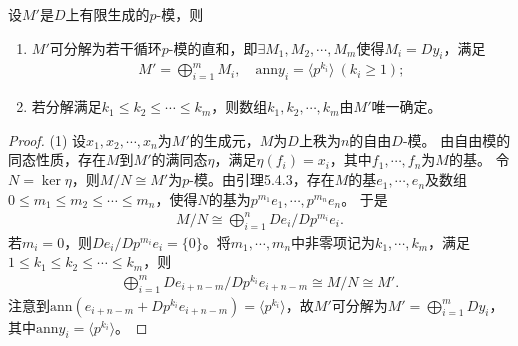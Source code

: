 \documentclass[../../main.tex]{subfiles}%
\begin{document}
\begin{theorem}
设$M'$是$D$上有限生成的$p$-模，则
\begin{enumerate}[(1)]
\item $M'$可分解为若干循环$p$-模的直和，即$\exists M_1,M_2,\cdots,M_m$使得$M_i=Dy_i$，满足
\begin{align*}
M'=\bigoplus\limits_{i=1}^{m}M_i,\quad \mathrm{ann}y_i=\langle p^{k_i}\rangle\ (k_i\geqslant1);
\end{align*}
\item 若分解满足$k_1\leqslant k_2\leqslant\cdots\leqslant k_m$，则数组$k_1,k_2,\cdots,k_m$由$M'$唯一确定。
\end{enumerate}
\end{theorem}
\begin{proof}
(1) 设$x_1,x_2,\cdots,x_n$为$M'$的生成元，$M$为$D$上秩为$n$的自由$D$-模。
由自由模的同态性质，存在$M$到$M'$的满同态$\eta$，满足$\eta(f_i)=x_i$，其中$f_1,\cdots,f_n$为$M$的基。
令$N=\ker\eta$，则$M/N\cong M'$为$p$-模。由引理5.4.3，存在$M$的基$e_1,\cdots,e_n$及数组$0\leqslant m_1\leqslant m_2\leqslant\cdots\leqslant m_n$，使得$N$的基为$p^{m_1}e_1,\cdots,p^{m_n}e_n$。
于是
\begin{align*}
M/N\cong\bigoplus\limits_{i=1}^{n}De_i/Dp^{m_i}e_i.
\end{align*}
若$m_i=0$，则$De_i/Dp^{m_i}e_i=\{0\}$。将$m_1,\cdots,m_n$中非零项记为$k_1,\cdots,k_m$，满足$1\leqslant k_1\leqslant k_2\leqslant\cdots\leqslant k_m$，则
\begin{align*}
\bigoplus\limits_{i=1}^{m}De_{i+n-m}/Dp^{k_i}e_{i+n-m}\cong M/N\cong M'.
\end{align*}
注意到$\mathrm{ann}(e_{i+n-m}+Dp^{k_i}e_{i+n-m})=\langle p^{k_i}\rangle$，故$M'$可分解为$M'=\bigoplus\limits_{i=1}^{m}Dy_i$，其中$\mathrm{ann}y_i=\langle p^{k_i}\rangle$。


\end{proof}
\end{document}

